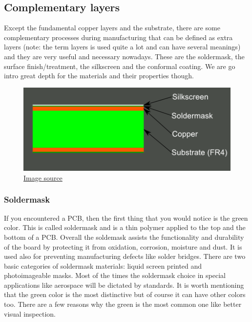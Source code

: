 \documentclass[final]{cubedoc}
\begin{document}
	\subsection{Complementary layers}
	\label{subsec:complementary}
	
	Except the fundamental copper layers and the substrate, there are some complementary processes during manufacturing that can be defined as extra layers (note: the term layers is used quite a lot and can have several meanings) and they are very useful and necessary nowadays. These are the soldermask, the surface finish/treatment, the silkscreen and the conformal coating. We are go intro great depth for the materials and their properties though.
	
	\begin{figure}[h!]
		\centering
		\centering
		\includegraphics[keepaspectratio, height=0.25\textheight, width=.6\textwidth]{assets/2_layer_plus_silkscreen.png}
		\caption{\href{https://learn.sparkfun.com/tutorials/using-eagle-board-layout/all}{Image source}}
	\end{figure}
	
	
	
	\subsubsection{Soldermask}
	
	If you encountered a PCB, then the first thing that you would notice is the green color. This is called soldermask and is a thin polymer applied to the top and the bottom of a PCB. Overall the soldemask assists the functionality and durability of the board by protecting it from oxidation, corrosion, moisture and dust. It is used also for preventing manufacturing defects like solder bridges.  There are two basic categories of soldermask materials: liquid screen printed and photoimageable masks. Most of the times the soldermask choice in special applications like aerospace will be dictated by standards. It is worth mentioning that the green color is the most distinctive but of course it can have other colors too. There are a few reasons why the green is the most common one like better visual inspection.
	
\end{document}
